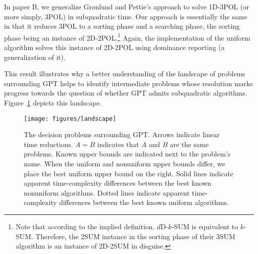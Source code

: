 In paper B, we generalize Gr\o nlund and Pettie's approach to solve 1D-3POL (or
more simply, 3POL) in subquadratic time. Our approach is essentially the same
in that it reduces 3POL to a sorting phase and a searching phase, the sorting
phase being an instance of 2D-2POL.\footnote{Note that according to the implied
definition, \(d\)D-\(k\)-SUM is equivalent to \(k\)-SUM. Therefore, the 2SUM
instance in the sorting phase of their 3SUM algorithm is an instance of 2D-2SUM
in disguise.} Again, the implementation of the uniform algorithm solves this
instance of 2D-2POL using dominance reporting (a generalization of it).

This result illustrates why a better understanding of the landscape of problems
surrounding GPT helps to identify intermediate problems whose resolution marks
progress towards the question of whether GPT admits subquadratic algorithms.
%
Figure~\ref{fig:landscape} depicts this landscape.

\begin{figure}
  \centering{}
  \texttt{[image: figures/landscape]}
  \caption{%
	The decision problems surrounding GPT.
	Arrows indicate linear time reductions.
	\(A = B\) indicates that \(A\) and \(B\) are the same problems.
	Known upper bounds are indicated next to the problem's name.
	When the uniform and nonuniform upper bounds differ, we place the best
	uniform upper bound on the right.
	Solid lines indicate apparent time-complexity differences between the best
	known nonuniform algorithms.
	Dotted lines indicate apparent
	time-complexity differences between the best known uniform algorithms.%
  }%
  \label{fig:landscape}
\end{figure}
